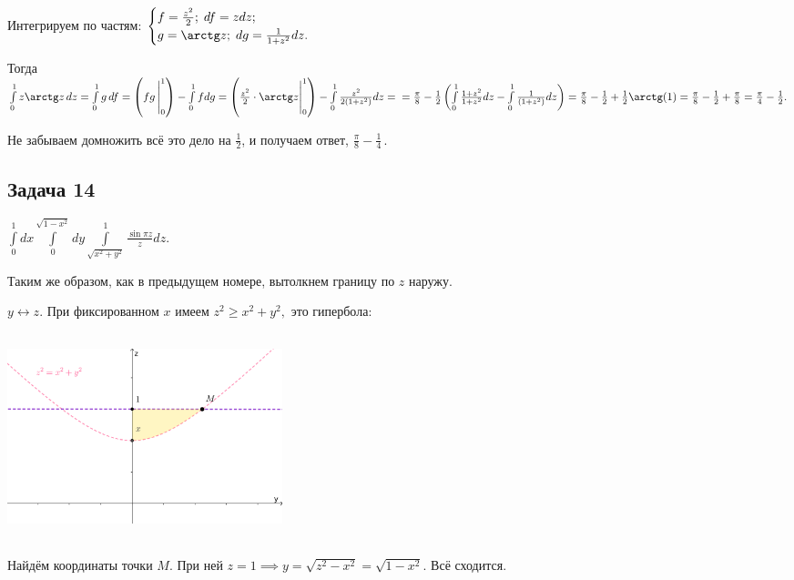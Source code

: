 \documentclass[a4paper, fleqn]{article}
\begin{document}
     Интегрируем по частям: $\begin{cases} f = \frac{z^2}{2}; \; df = zdz; \\
     g  = \arctg z; \; dg = \frac{1}{1 + z^2} dz.
     \end{cases}$

     Тогда $\int\limits_{0}^{1} z \arctg z \, dz = \int\limits_{0}^{1} g \, df = \left( fg \,  \Bigg|_{0}^{1} \right) - \int\limits_{0}^{1} fdg =  \left( \frac{z^2}{2} \cdot \arctg z \Bigg|_{0}^{1} \right) - \int\limits_{0}^{1} \frac{z^2}{2(1 + z^2)} dz = \\ = \frac{\pi}{8} -  \frac{1}{2} \left(\int\limits_{0}^{1} \frac{1 + z^2}{1 + z^2} dz -  \int\limits_{0}^{1} \frac{1}{(1 + z^2)} dz\right) = \frac{\pi}{8} - \frac{1}{2} + \frac{1}{2} \arctg(1) = \frac{\pi}{8} - \frac{1}{2} + \frac{\pi}{8} = \frac{\pi}{4} - \frac{1}{2}.$ 

     Не забываем домножить всё это дело на $\frac{1}{2}$, и получаем ответ, $\boxed{\frac{\pi}{8} - \frac{1}{4}} \, .$

    \subsection*{Задача 14}
    
    $\displaystyle \int\limits_{0}^{1} dx \int\limits_{0}^{\sqrt{1 - x^2}} dy \int\limits_{\sqrt{x^2 + y^2}}^{1} \frac{\sin \pi z}{z} dz.$
    
    Таким же образом, как в предыдущем номере, вытолкнем границу по $z$ наружу.
    
    $y \leftrightarrow z.$ При фиксированном $x$ имеем $z^2 \geq x^2 + y^2,$ это гипербола:
    
    \includegraphics[width=8cm, height=6cm]{list24imgs/task 2.4.14-1.png}
    
    Найдём координаты точки $M.$ При ней $z = 1\implies y =  \sqrt{z^2 - x^2} = \sqrt{1 - x^2}.$ Всё сходится.
    
\end{document}
